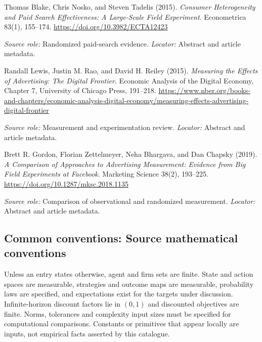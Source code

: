 \documentclass[11pt,a4paper]{article}
\begin{document}
\begin{enumerate}[label={[S\arabic*]},leftmargin=*]

\item Thomas Blake, Chris Nosko, and Steven Tadelis (2015). \emph{Consumer Heterogeneity and Paid Search Effectiveness: A Large-Scale Field Experiment}. Econometrica 83(1), 155--174. \url{https://doi.org/10.3982/ECTA12423}\par \textit{Source role:} Randomized paid-search evidence. \textit{Locator:} Abstract and article metadata.

\item Randall Lewis, Justin M. Rao, and David H. Reiley (2015). \emph{Measuring the Effects of Advertising: The Digital Frontier}. Economic Analysis of the Digital Economy, Chapter 7, University of Chicago Press, 191--218. \url{https://www.nber.org/books-and-chapters/economic-analysis-digital-economy/measuring-effects-advertising-digital-frontier}\par \textit{Source role:} Measurement and experimentation review. \textit{Locator:} Abstract and article metadata.

\item Brett R. Gordon, Florian Zettelmeyer, Neha Bhargava, and Dan Chapsky (2019). \emph{A Comparison of Approaches to Advertising Measurement: Evidence from Big Field Experiments at Facebook}. Marketing Science 38(2), 193--225. \url{https://doi.org/10.1287/mksc.2018.1135}\par \textit{Source role:} Comparison of observational and randomized measurement. \textit{Locator:} Abstract and article metadata.

\end{enumerate}

\subsection*{Common conventions: Source mathematical conventions}

Unless an entry states otherwise, agent and firm sets are finite. State and action spaces are measurable, strategies and outcome maps are measurable, probability laws are specified, and expectations exist for the targets under discussion. Infinite-horizon discount factors lie in $(0,1)$ and discounted objectives are finite. Norms, tolerances and complexity input sizes must be specified for computational comparisons. Constants or primitives that appear locally are inputs, not empirical facts asserted by this catalogue.
\end{document}

